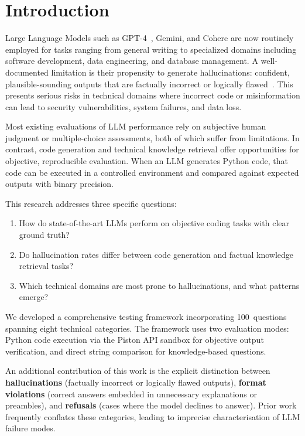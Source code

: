 \documentclass[conference]{IEEEtran}
\begin{document}
\section{Introduction}

Large Language Models such as GPT-4~\cite{achiam2023gpt4}, Gemini, and Cohere are now routinely employed for tasks ranging from general writing to specialized domains including software development, data engineering, and database management. A well-documented limitation is their propensity to generate hallucinations: confident, plausible-sounding outputs that are factually incorrect or logically flawed~\cite{ji2023survey}. This presents serious risks in technical domains where incorrect code or misinformation can lead to security vulnerabilities, system failures, and data loss.

Most existing evaluations of LLM performance rely on subjective human judgment or multiple-choice assessments, both of which suffer from limitations. In contrast, code generation and technical knowledge retrieval offer opportunities for objective, reproducible evaluation. When an LLM generates Python code, that code can be executed in a controlled environment and compared against expected outputs with binary precision.

This research addresses three specific questions:
\begin{enumerate}[leftmargin=*]
  \item How do state-of-the-art LLMs perform on objective coding tasks with clear ground truth?
  \item Do hallucination rates differ between code generation and factual knowledge retrieval tasks?
  \item Which technical domains are most prone to hallucinations, and what patterns emerge?
\end{enumerate}

We developed a comprehensive testing framework incorporating 100~questions spanning eight technical categories. The framework uses two evaluation modes: Python code execution via the Piston API sandbox for objective output verification, and direct string comparison for knowledge-based questions.

An additional contribution of this work is the explicit distinction between \textbf{hallucinations} (factually incorrect or logically flawed outputs), \textbf{format violations} (correct answers embedded in unnecessary explanations or preambles), and \textbf{refusals} (cases where the model declines to answer). Prior work frequently conflates these categories, leading to imprecise characterisation of LLM failure modes.
\end{document}
